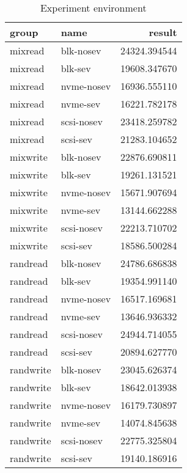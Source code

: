 \documentclass[twocolumn]{article}
\begin{document}
\begin{table*}
    \centering
    \label{tab:iops-results}
    \begin{tabular}{|l|l|r|}
        \hline
        group &       name &       result \\
        \hline
        mixread &  blk-nosev & 24324.394544 \\
        mixread &    blk-sev & 19608.347670 \\
        mixread & nvme-nosev & 16936.555110 \\
        mixread &   nvme-sev & 16221.782178 \\
        mixread & scsi-nosev & 23418.259782 \\
        mixread &   scsi-sev & 21283.104652 \\
        mixwrite &  blk-nosev & 22876.690811 \\
        mixwrite &    blk-sev & 19261.131521 \\
        mixwrite & nvme-nosev & 15671.907694 \\ 
        mixwrite &   nvme-sev & 13144.662288 \\
        mixwrite & scsi-nosev & 22213.710702 \\
        mixwrite &   scsi-sev & 18586.500284 \\
        randread &  blk-nosev & 24786.686838 \\
        randread &    blk-sev & 19354.991140 \\
        randread & nvme-nosev & 16517.169681 \\
        randread &   nvme-sev & 13646.936332 \\
        randread & scsi-nosev & 24944.714055 \\
        randread &   scsi-sev & 20894.627770 \\
        randwrite &  blk-nosev & 23045.626374 \\
        randwrite &    blk-sev & 18642.013938 \\
        randwrite & nvme-nosev & 16179.730897 \\
        randwrite &   nvme-sev & 14074.845638 \\
        randwrite & scsi-nosev & 22775.325804 \\
        randwrite &   scsi-sev & 19140.186916 \\
        \hline  
    \end{tabular}
    \caption{Experiment environment}
\end{table*}
\end{document}
